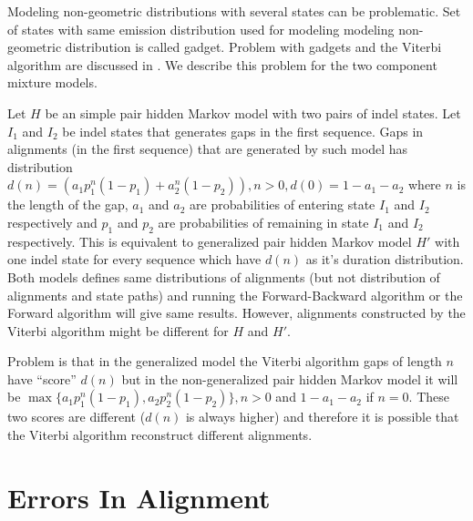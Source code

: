 Modeling non-geometric distributions with several states can be problematic. Set
of states with same emission distribution used for modeling modeling
non-geometric distribution is called gadget. Problem with gadgets and the
Viterbi algorithm are discussed in \cite{TomasovaDizertacka}. We describe this
problem for the two component mixture models.

Let $H$ be an simple pair hidden Markov model with two pairs of indel states.
Let $I_1$ and $I_2$ be indel states that generates gaps in the first sequence.
Gaps in alignments (in the first sequence) that are generated by such model has
distribution $d(n)=(a_1p_1^n(1-p_1)+a_2^n(1-p_2)), n>0, d(0)=1-a_1-a_2$ where
$n$ is the length of the gap, $a_1$ and $a_2$ are probabilities of entering
state $I_1$ and $I_2$ respectively and $p_1$ and $p_2$ are probabilities of
remaining in state $I_1$ and $I_2$ respectively. This is equivalent to
generalized pair hidden Markov model $H'$ with one indel state for every
sequence which have $d(n)$ as it's duration distribution. Both models defines
same distributions of alignments (but not distribution of alignments and state
paths) and running the Forward-Backward algorithm or the Forward algorithm will 
give same results. However, alignments constructed by the Viterbi algorithm
might be different for $H$ and $H'$.

Problem is that in the generalized model the Viterbi algorithm gaps of length
$n$ have ``score'' $d(n)$ but in the non-generalized pair hidden Markov model it
will be $\max\{a_1p_1^n(1-p_1),a_2p_2^n(1-p_2)\}, n>0$ and $1-a_1-a_2$ if $n=0$.
These two scores are different ($d(n)$ is always higher) and therefore it is
possible that the Viterbi algorithm reconstruct different alignments.




\section{Errors In Alignment}
